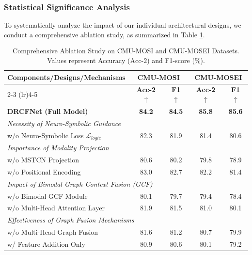 \documentclass[sn-mathphys,Numbered]{sn-jnl}
\theoremstyle{thmstyleone}
\theoremstyle{thmstyletwo}
\theoremstyle{thmstylethree}
\begin{document}
\subsubsection{Statistical Significance Analysis}\label{subsubsec:stat}
To systematically analyze the impact of our individual architectural designs, we conduct a comprehensive ablation study, as summarized in Table \ref{tab:ablation}.
\begin{table}[htbp]
\centering
\caption{Comprehensive Ablation Study on CMU-MOSI and CMU-MOSEI Datasets. Values represent Accuracy ($\text{Acc-2}$) and F1-score (\%).}
\label{tab:ablation}
\setlength{\tabcolsep}{8pt}
\renewcommand{\arraystretch}{1.2}
\footnotesize
\begin{tabular}{l cccc}
\toprule
\multirow{2}{*}{\textbf{Components/Designs/Mechanisms}} & \multicolumn{2}{c}{\textbf{CMU-MOSI}} & \multicolumn{2}{c}{\textbf{CMU-MOSEI}} \\
\cmidrule(lr){2-3} \cmidrule(lr){4-5}
 & \textbf{Acc-2 $\uparrow$} & \textbf{F1 $\uparrow$} & \textbf{Acc-2 $\uparrow$} & \textbf{F1 $\uparrow$} \\
\midrule
\textbf{DRCFNet (Full Model)} & \textbf{84.2} & \textbf{84.5} & \textbf{85.8} & \textbf{85.6} \\
\midrule
\multicolumn{5}{l}{\textit{Necessity of Neuro-Symbolic Guidance}} \\
\midrule
\quad w/o Neuro-Symbolic Loss $\mathcal{L}_{logic}$ & 82.3 & 81.9 & 81.4 & 80.6 \\
\midrule
\multicolumn{5}{l}{\textit{Importance of Modality Projection}} \\
\midrule
\quad w/o MSTCN Projection & 80.6 & 80.2 & 79.8 & 78.9 \\
\midrule
\quad w/o Positional Encoding & 83.0 & 82.7 & 82.2 & 81.4 \\
\midrule
\multicolumn{5}{l}{\textit{Impact of Bimodal Graph Context Fusion (GCF)}} \\
\midrule
\quad w/o Bimodal GCF Module & 80.1 & 79.7 & 79.4 & 78.4 \\
\midrule
\quad w/o Multi-Head Attention Layer & 81.9 & 81.5 & 81.0 & 80.1 \\
\midrule
\multicolumn{5}{l}{\textit{Effectiveness of Graph Fusion Mechanisms}} \\
\midrule
\quad w/o Multi-Head Graph Fusion & 81.6 & 81.2 & 80.7 & 79.9 \\
\midrule
\quad w/ Feature Addition Only & 80.9 & 80.6 & 80.1 & 79.2 \\
\bottomrule
\end{tabular}
\end{table}
\end{document}
